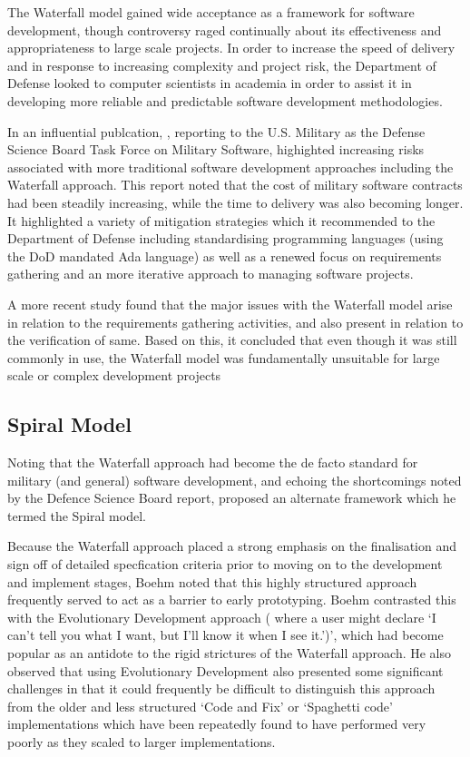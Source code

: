 \documentclass[a4paper,12pt]{article}
\begin{document}
\begin{samepage}
The Waterfall model gained wide acceptance as a framework for software development, though controversy raged continually about its effectiveness and appropriateness to large scale projects. In order to increase the speed of delivery and in response to increasing complexity and project risk, the Department of Defense looked to computer scientists in academia in order to assist it in developing more reliable and predictable software development methodologies. 

In an influential publcation, \parencite{defensesscienceboard}, reporting to the U.S. Military as the Defense Science Board Task Force on Military Software, highighted increasing risks associated with more traditional software development approaches including the Waterfall approach. This report noted that the cost of military software contracts had been steadily increasing, while the time to delivery was also becoming longer. It highlighted a variety of mitigation strategies which it recommended to the Department of Defense including standardising programming languages (using the DoD mandated Ada language) as well as a renewed focus on requirements gathering and an more iterative approach to managing software projects.

A more recent study \parencite{peterson} found that the major issues with the Waterfall model arise in relation to the requirements gathering activities, and also present in relation to the verification of same. Based on this, it concluded that even though it was still commonly in use, the Waterfall model was fundamentally unsuitable for large scale or complex development projects

\subsection {Spiral Model}
Noting that the Waterfall approach had become the de facto standard for military (and general) software development, and echoing the shortcomings noted by the Defence Science Board report, \parencite{boehm} proposed an alternate framework which he termed the Spiral model. 

Because the Waterfall approach placed a strong emphasis on the finalisation and sign off of detailed specfication criteria prior to moving on to the development and implement stages, Boehm noted that this highly structured approach frequently served to act as a barrier to early prototyping. Boehm contrasted this with the Evolutionary Development approach ( where a user might declare `I can’t tell you what I want, but I’ll know it when I see it.')', which had become popular as an antidote to the rigid strictures of the Waterfall approach. He also observed that using  Evolutionary Development also presented some significant challenges in that it could frequently be difficult to distinguish this approach from the older and less structured `Code and Fix' or `Spaghetti code' implementations which have been repeatedly found to have performed very poorly as they scaled to larger implementations.


\end{samepage}
\end{document}
